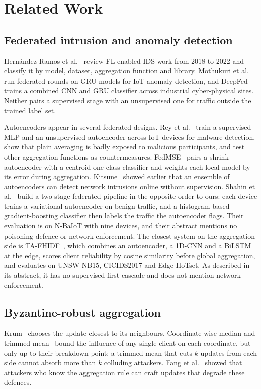 \section{Related Work}
\label{sec:related}
\subsection{Federated intrusion and anomaly detection}
Hern{\'a}ndez-Ramos et al.~\cite{hernandez2025} review FL-enabled IDS work from 2018 to 2022 and classify it by model, dataset, aggregation function and library. Mothukuri et al.~\cite{mothukuri2022} run federated rounds on GRU models for IoT anomaly detection, and DeepFed~\cite{li2021deepfed} trains a combined CNN and GRU classifier across industrial cyber-physical sites. Neither pairs a supervised stage with an unsupervised one for traffic outside the trained label set.

Autoencoders appear in several federated designs. Rey et al.~\cite{rey2022} train a supervised MLP and an unsupervised autoencoder across IoT devices for malware detection, show that plain averaging is badly exposed to malicious participants, and test other aggregation functions as countermeasures. FedMSE~\cite{nguyen2025fedmse} pairs a shrink autoencoder with a centroid one-class classifier and weights each local model by its error during aggregation. Kitsune~\cite{mirsky2018} showed earlier that an ensemble of autoencoders can detect network intrusions online without supervision. Shahin et al.~\cite{shahin2025} build a two-stage federated pipeline in the opposite order to ours: each device trains a variational autoencoder on benign traffic, and a histogram-based gradient-boosting classifier then labels the traffic the autoencoder flags. Their evaluation is on N-BaIoT with nine devices, and their abstract mentions no poisoning defence or network enforcement. The closest system on the aggregation side is TA-FHIDF~\cite{sazid2026}, which combines an autoencoder, a 1D-CNN and a BiLSTM at the edge, scores client reliability by cosine similarity before global aggregation, and evaluates on UNSW-NB15, CICIDS2017 and Edge-IIoTset. As described in its abstract, it has no supervised-first cascade and does not mention network enforcement.

\subsection{Byzantine-robust aggregation}
Krum~\cite{blanchard2017} chooses the update closest to its neighbours. Coordinate-wise median and trimmed mean~\cite{yin2018} bound the influence of any single client on each coordinate, but only up to their breakdown point: a trimmed mean that cuts $k$ updates from each side cannot absorb more than $k$ colluding attackers. Fang et al.~\cite{fang2020} showed that attackers who know the aggregation rule can craft updates that degrade these defences.

